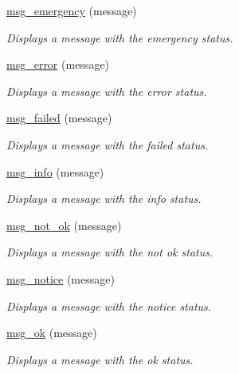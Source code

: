 \begin{DoxyCompactItemize}
\hyperlink{group__message_ga3b4d3c652e7fdb3189a738a6cb1a99fd}{msg\+\_\+emergency} (message)
\begin{DoxyCompactList}\small\item\em Displays a message with the \textquotesingle{}emergency\textquotesingle{} status. \end{DoxyCompactList}\item 
\hyperlink{group__message_ga8fead3d7c844b6cfed0ca5ef0d930565}{msg\+\_\+error} (message)
\begin{DoxyCompactList}\small\item\em Displays a message with the \textquotesingle{}error\textquotesingle{} status. \end{DoxyCompactList}\item 
\hyperlink{group__message_ga1051f1ddca193760016f3021e885dfbb}{msg\+\_\+failed} (message)
\begin{DoxyCompactList}\small\item\em Displays a message with the \textquotesingle{}failed\textquotesingle{} status. \end{DoxyCompactList}\item 
\hyperlink{group__message_gad043c4df79f7cc2143ab6d3a67ea20da}{msg\+\_\+info} (message)
\begin{DoxyCompactList}\small\item\em Displays a message with the \textquotesingle{}info\textquotesingle{} status. \end{DoxyCompactList}\item 
\hyperlink{group__message_gadba552b40430d43c306129dccb9bb6ba}{msg\+\_\+not\+\_\+ok} (message)
\begin{DoxyCompactList}\small\item\em Displays a message with the \textquotesingle{}not ok\textquotesingle{} status. \end{DoxyCompactList}\item 
\hyperlink{group__message_ga61150f29d9ff1be264ec6d95a7b10161}{msg\+\_\+notice} (message)
\begin{DoxyCompactList}\small\item\em Displays a message with the \textquotesingle{}notice\textquotesingle{} status. \end{DoxyCompactList}\item 
\hyperlink{group__message_ga9f9b130e50d82e4ef3bf3554df755078}{msg\+\_\+ok} (message)
\begin{DoxyCompactList}\small\item\em Displays a message with the \textquotesingle{}ok\textquotesingle{} status. \end{DoxyCompactList}\item 

\end{DoxyCompactItemize}
